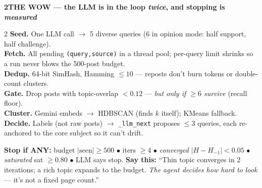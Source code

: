 \documentclass[10pt,a4paper]{article}
\newcommand{\code}[1]{\texttt{\small #1}}
\newcommand{\band}[2]{%
  \vspace{1pt}\noindent\colorbox{#1}{\begin{minipage}{\dimexpr\linewidth-2\fboxsep}%
  \color{white}\bfseries\small #2\end{minipage}}\par\vspace{0pt}}
\begin{document}
\band{accent2}{2\quad THE WOW — the LLM is in the loop \emph{twice}, and stopping is \emph{measured}}

\begin{multicols}{2}
{\footnotesize
\textbf{Seed.} One LLM call $\rightarrow$ 5 diverse queries (6 in opinion mode: half support, half challenge).\\[2pt]
\textbf{Fetch.} All pending \code{(query,source)} in a thread pool; per-query limit shrinks so a run never blows the 500-post budget.\\[2pt]
\textbf{Dedup.} 64-bit SimHash, Hamming $\le10$ — reposts don't burn tokens or double-count clusters.\\[2pt]
\textbf{Gate.} Drop posts with topic-overlap $<0.12$ — \emph{but only if $\ge6$ survive} (recall floor).\\[2pt]
\textbf{Cluster.} Gemini embeds $\rightarrow$ HDBSCAN (finds $k$ itself); KMeans fallback.\\[2pt]
\textbf{Decide.} Labels (not raw posts) $\rightarrow$ \code{\_llm\_next} proposes $\le3$ queries, each re-anchored to the core subject so it can't drift.
}

\columnbreak

\begin{center}
\end{center}
\end{multicols}
\vspace{-4pt}
{\footnotesize\colorbox{warn!12}{\begin{minipage}{\dimexpr\linewidth-2\fboxsep}
\textbf{Stop if ANY:} budget $|\text{seen}|\ge500$ \;$\bullet$\; iters $\ge4$ \;$\bullet$\;
\emph{converged} $|H{-}H_{-1}|<0.05$ \;$\bullet$\; \emph{saturated} sat $\ge0.80$ \;$\bullet$\; LLM says stop.
\textbf{Say this:} ``Thin topic converges in 2 iterations; a rich topic expands to the budget. \emph{The agent decides how hard to look} — it's not a fixed page count.''
\end{minipage}}}
\end{document}
